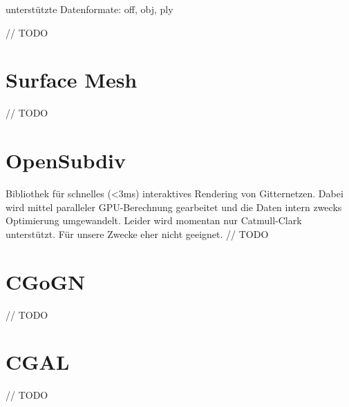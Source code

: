 unterstützte Datenformate: off, obj, ply

// TODO


\section{Surface Mesh}

// TODO


\section{OpenSubdiv}

Bibliothek für schnelles (<3ms) interaktives Rendering von Gitternetzen. Dabei wird mittel paralleler GPU-Berechnung gearbeitet und die Daten intern zwecks Optimierung umgewandelt. Leider wird momentan nur Catmull-Clark unterstützt. Für unsere Zwecke eher nicht geeignet.
// TODO


\section{CGoGN}

// TODO


\section{\acf{CGAL}}

// TODO
